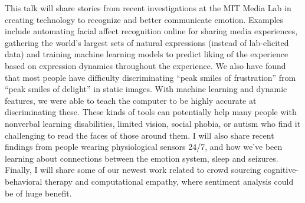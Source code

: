 This talk will share stories from recent investigations at the MIT Media Lab in creating technology to recognize and better communicate emotion.  Examples
 include automating facial affect recognition online for sharing media
 experiences, gathering the world's largest sets of natural expressions
 (instead of lab-elicited data) and training machine learning models to predict
 liking of the experience based on expression dynamics throughout the
 experience.   We also have found that most people have difficulty
 discriminating ``peak smiles of frustration'' from ``peak smiles of
 delight'' in static images.  With machine learning and dynamic features, we
 were able to teach the computer to be highly accurate at discriminating these. 
 These kinds of tools can potentially help many people with nonverbal learning
 disabilities, limited vision, social phobia, or autism who find it challenging
 to read the faces of those around them.  I will also share recent findings from
 people wearing physiological sensors 24/7, and how we've been learning about
 connections between the emotion system, sleep and seizures.  Finally, I will
 share some of our newest work related to crowd sourcing cognitive-behavioral
 therapy and computational empathy, where sentiment analysis could be of huge
 benefit.


